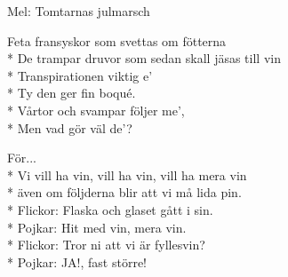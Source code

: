 \begin{SongText}
    \begin{SongInfo}
        Mel: Tomtarnas julmarsch
    \end{SongInfo}
    \begin{SongVerse}
        Feta fransyskor som svettas om fötterna\\*%
        De trampar druvor som sedan skall jäsas till vin\\*%
        Transpirationen viktig e’\\*%
        Ty den ger fin boqué.\\*%
        Vårtor och svampar följer me’,\\*%
        Men vad gör väl de’?
    \end{SongVerse}
    \begin{SongVerse}
        För...\\*%
        Vi vill ha vin, vill ha vin, vill ha mera vin\\*%
        även om följderna blir att vi må lida pin.\\*%
        Flickor: Flaska och glaset gått i sin.\\*%
        Pojkar: Hit med vin, mera vin.\\*%
        Flickor: Tror ni att vi är fyllesvin?\\*%
        Pojkar: JA!, fast större!
    \end{SongVerse}
\end{SongText}
